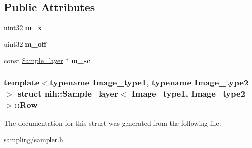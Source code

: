 \subsection*{\-Public \-Attributes}
\begin{DoxyCompactItemize}
\item 
\hypertarget{structnih_1_1_sample__layer_1_1_row_acfe4a8db4de933753d4135cba868d414}{
uint32 {\bfseries m\-\_\-x}}
\label{structnih_1_1_sample__layer_1_1_row_acfe4a8db4de933753d4135cba868d414}

\item 
\hypertarget{structnih_1_1_sample__layer_1_1_row_ae0414bf1ec4b7a942efb541b19de908f}{
uint32 {\bfseries m\-\_\-off}}
\label{structnih_1_1_sample__layer_1_1_row_ae0414bf1ec4b7a942efb541b19de908f}

\item 
\hypertarget{structnih_1_1_sample__layer_1_1_row_a7ebb951d8fa68fb6b78bcc710195bbcd}{
const \hyperlink{classnih_1_1_sample__layer}{\-Sample\-\_\-layer} $\ast$ {\bfseries m\-\_\-sc}}
\label{structnih_1_1_sample__layer_1_1_row_a7ebb951d8fa68fb6b78bcc710195bbcd}

\end{DoxyCompactItemize}
\subsubsection*{template$<$typename Image\-\_\-type1, typename Image\-\_\-type2$>$ struct nih\-::\-Sample\-\_\-layer$<$ Image\-\_\-type1, Image\-\_\-type2 $>$\-::\-Row}



\-The documentation for this struct was generated from the following file\-:\begin{DoxyCompactItemize}
\item 
sampling/\hyperlink{sampler_8h}{sampler.\-h}\end{DoxyCompactItemize}
